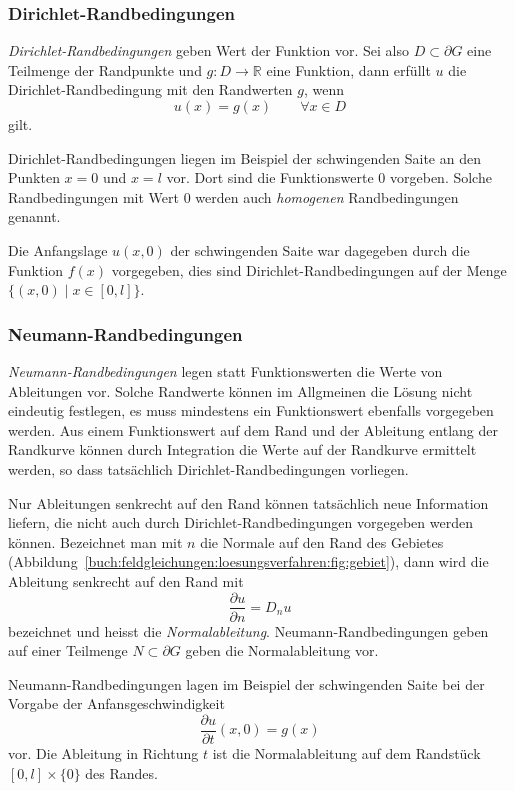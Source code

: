 %
%
\subsubsection{Dirichlet-Randbedingungen}
%
{\em Dirichlet-Randbedingungen} geben Wert der Funktion vor.
Sei also $D\subset\partial G$ eine Teilmenge der Randpunkte
und $g\colon D\to\mathbb{R}$ eine Funktion, dann erfüllt $u$
die Dirichlet-Randbedingung mit den Randwerten $g$, wenn
\[
u(x) = g(x)\qquad \forall x\in D
\]
gilt.

Dirichlet-Randbedingungen liegen im Beispiel der schwingenden Saite
an den Punkten $x=0$ und $x=l$ vor.
Dort sind die Funktionswerte $0$ vorgeben.
Solche Randbedingungen mit Wert 0 werden auch {\em homogenen} 
Randbedingungen genannt.

Die Anfangslage $u(x,0)$ der schwingenden Saite war dagegeben durch
die Funktion $f(x)$ vorgegeben, dies sind Dirichlet-Randbedingungen
auf der Menge $\{(x,0)\mid x\in[0,l]\}$.

\subsubsection{Neumann-Randbedingungen}
%
{\em Neumann-Randbedingungen} legen statt Funktionswerten die Werte
von Ableitungen vor.
Solche Randwerte können im Allgmeinen die Lösung nicht eindeutig
festlegen, es muss mindestens ein Funktionswert ebenfalls vorgegeben
werden.
Aus einem Funktionswert auf dem Rand und der Ableitung entlang
der Randkurve können durch Integration die Werte auf der Randkurve
ermittelt werden, so dass tatsächlich Dirichlet-Randbedingungen
vorliegen.

Nur Ableitungen senkrecht auf den Rand können tatsächlich neue
Information liefern, die nicht auch durch Dirichlet-Randbedingungen
vorgegeben werden können.
Bezeichnet man mit $n$ die Normale auf den Rand des Gebietes
(Abbildung~\ref{buch:feldgleichungen:loesungsverfahren:fig:gebiet}),
dann wird die Ableitung senkrecht auf den Rand mit
\[
\frac{\partial u}{\partial n}
=
D_n u
\]
bezeichnet und heisst die {\em Normalableitung}.
%
Neumann-Randbedingungen geben auf einer Teilmenge $N\subset\partial G$
geben die Normalableitung vor.

Neumann-Randbedingungen lagen im Beispiel der schwingenden Saite bei
der Vorgabe der Anfansgeschwindigkeit
\[
\frac{\partial u}{\partial t}(x,0)
=
g(x)
\]
vor.
Die Ableitung in Richtung $t$ ist die Normalableitung auf dem Randstück
$[0,l]\times \{0\}$ des Randes.

